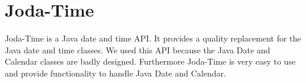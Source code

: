 \section{Joda-Time}
Joda-Time is a Java date and time API. It provides a quality replacement for the Java date and time classes. We used this API because the Java Date and Calendar classes are badly designed. Furthermore Joda-Time is very easy to use and provide functionality to handle Java Date and Calendar.
